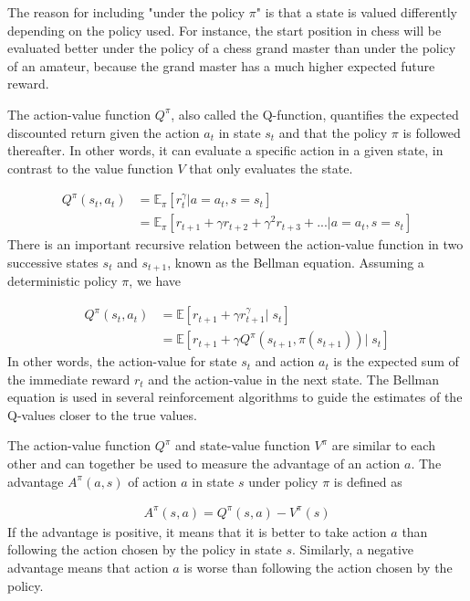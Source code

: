 \documentclass[class=book, crop=false]{standalone}
\begin{document}
The reason for including "under the policy $\pi$" is that a state is valued differently depending on the policy used. For instance, the start position in chess will be evaluated better under the policy of a chess grand master than under the policy of an amateur, because the grand master has a much higher expected future reward. 



The action-value function $Q^{\pi}$, also called the Q-function, quantifies the expected discounted return given the action $a_{t}$ in state $s_{t}$ and that the policy $\pi$ is followed thereafter. In other words, it can evaluate a specific action in a given state, in contrast to the value function $V$ that only evaluates the state.

\begin{equation}
   \begin{aligned}\label{eq:theory:action_value_function}
Q^{\pi}(s_{t},a_{t}) 
&= \mathbb{E}_{\pi}[r^{\gamma}_{t}|a=a_{t} ,s=s_{t}]
\\
&= \mathbb{E}_{\pi}[ r_{t+1} + \gamma r_{t+2} + \gamma^{2} r_{t+3} + ...|a=a_{t} ,s=s_{t}]
\end{aligned} 
\end{equation}
There is an important recursive relation between the action-value function in two successive states $s_{t}$ and $s_{t+1}$, known as the Bellman equation. Assuming a deterministic policy $\pi$, we have

\begin{equation}
   \begin{aligned}\label{eq:theory:bellman_equation}
Q^{\pi}(s_{t},a_{t}) 
&= \mathbb{E}[r_{t+1} +\gamma r^{\gamma}_{t+1} |\; s_{t}] \\
& = \mathbb{E}[r_{t+1} +\gamma Q^{\pi}(s_{t+1},\pi(s_{t+1}))|\; s_{t}]
\end{aligned} 
\end{equation}
In other words, the action-value for state $s_{t}$ and action $a_{t}$ is the expected sum of the immediate reward $r_{t}$ and the action-value in the next state. The Bellman equation is used in several reinforcement algorithms to guide the estimates of the Q-values closer to the true values.

The action-value function $Q^{\pi}$ and state-value function $V^{\pi}$ are similar to each other and can together be used to measure the advantage of an action $a$. The advantage $A^{\pi}(a,s)$ of action $a$ in state $s$ under policy $\pi$ is defined as 

\begin{equation}
   \begin{aligned}\label{eq:theory:advantage_function}
A^{\pi}(s,a) =  Q^{\pi}(s,a) - V^{\pi}(s)
\end{aligned} 
\end{equation}
If the advantage is positive, it means that it is better to take action $a$ than following the action chosen by the policy in state $s$. Similarly, a negative advantage means that action $a$ is worse than following the action chosen by the policy.
\end{document}
